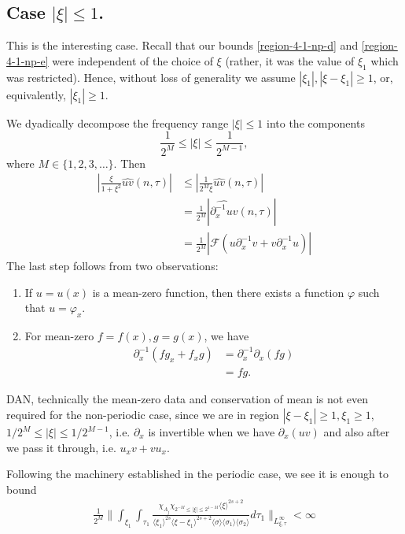 \documentclass[12pt,reqno]{amsart}
\numberwithin{equation}{section}  %
\newcommand{\wh}{\widehat}
\newcommand{\p}{\partial}
\begin{document}
\subsection{Case $| \xi| \le 1$.} 
\label{ssec:xisimxi1}
This is the interesting case. Recall that our bounds 
\eqref{region-4-1-np-d} and \eqref{region-4-1-np-e}
were independent of the choice of $\xi$ (rather, it was the value of $\xi_{1}$ which was restricted). Hence, without loss of generality we assume $| \xi_{1} |, | \xi - \xi_{1} | \ge 1$, or, equivalently, $|\xi_{1}| \ge 1$. 
\begin{framed}
We dyadically decompose the frequency range $| \xi | \le 1$ into the components \[\frac{1}{2^{M}} \le | \xi | \le \frac{1}{2^{M-1}},\] where $M \in \{1, 2, 3, \dots\}$. Then 
\begin{equation*}
\begin{split}
|\frac{\xi}{1 + \xi^{2}} \wh{uv}(n, \tau)| 
& \le | \frac{1}{2^{M} \xi} \wh{uv}(n, \tau)|
\\
& =\frac{1}{2^{M}} |\wh{\p_{x}^{-1} uv}(n, \tau)|
\\
& = \frac{1}{2^{M}}|\mathcal{F}(u \p_{x}^{-1}v + v \p_{x}^{-1} u)|
\end{split}
\end{equation*}
The last step follows from two observations: 
\begin{enumerate}
\item{} If $u = u(x)$ is a mean-zero function, then there exists a function $\varphi$ such that $u = \varphi_{x}$.  
\item{} For mean-zero $f=f(x),g=g(x)$, we have
\begin{equation*}
\begin{split}
\p_{x}^{-1}(fg_{x} + f_{x}g) 
& = \p_{x}^{-1} \p_{x}(fg)
\\
&= fg.
\end{split}
\end{equation*}
\end{enumerate}
DAN, technically the mean-zero data and conservation of mean is not even required for the non-periodic case, since we are in region $| \xi - \xi_{1} | \ge 1, \xi_{1} \ge 1$, $1/2^{M} \le | \xi | \le 1/2^{M-1}$, i.e. $\p_{x}$ is invertible when we have $\p_{x}(uv)$ and also after we pass it through, i.e. $u_{x} v + v u_{x}$.
\end{framed}
Following the machinery established in the periodic case, we see it is enough to bound
\begin{equation}
\begin{split}
  \frac{1}{2^{M}} \|    \int_{\xi_{1}} \int_{\tau_{1}} \frac{\chi_{A_{j}} \chi_{2^{-M} \le |\xi | \le 2^{1-M} }\langle \xi \rangle ^{2s+2} }{\langle \xi_{1} \rangle ^{2s} \langle \xi-\xi_{1} \rangle ^{2s+2} 
\langle \sigma \rangle   \langle \sigma_{1} \rangle \langle  \sigma_{2}
\rangle} 
d \tau_1  \|_{L^{\infty}_{\xi, \tau}} < \infty
\end{split}
\end{equation}
\end{document}
